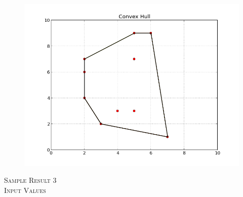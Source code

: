 \documentclass[pdftex,12pt,a4paper]{article}
\newcommand{\nspace}{\\[0.25cm]}
\begin{document}
\begin{figure}[h!]
  \centering
	\includegraphics[scale=0.65]{img/monotone_test_2.png}
\end{figure}



\textsc{\large Sample Result 3} \hfill \nspace

\textsc{Input Values} \hfill \nspace
\end{document}
